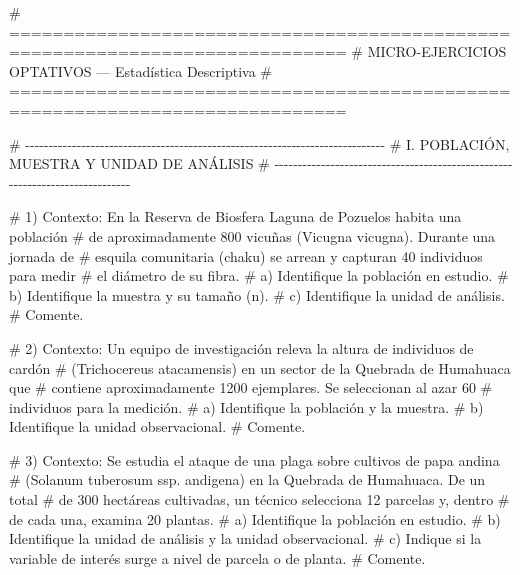 \documentclass[
  spanish,
  letterpaper,
  DIV=11,
  numbers=noendperiod]{scrreprt}
\newenvironment{Shaded}{\begin{snugshade}}{\end{snugshade}}
\newcommand{\CommentTok}[1]{\textcolor[rgb]{0.37,0.37,0.37}{#1}}
\begin{document}
\begin{Shaded}
\begin{Highlighting}[]


\CommentTok{\# =============================================================================}
\CommentTok{\# MICRO{-}EJERCICIOS OPTATIVOS — Estadística Descriptiva}
\CommentTok{\# =============================================================================}

\CommentTok{\# {-}{-}{-}{-}{-}{-}{-}{-}{-}{-}{-}{-}{-}{-}{-}{-}{-}{-}{-}{-}{-}{-}{-}{-}{-}{-}{-}{-}{-}{-}{-}{-}{-}{-}{-}{-}{-}{-}{-}{-}{-}{-}{-}{-}{-}{-}{-}{-}{-}{-}{-}{-}{-}{-}{-}{-}{-}{-}{-}{-}{-}{-}{-}{-}{-}{-}{-}{-}{-}{-}{-}{-}{-}{-}{-}{-}{-}}
\CommentTok{\# I. POBLACIÓN, MUESTRA Y UNIDAD DE ANÁLISIS}
\CommentTok{\# {-}{-}{-}{-}{-}{-}{-}{-}{-}{-}{-}{-}{-}{-}{-}{-}{-}{-}{-}{-}{-}{-}{-}{-}{-}{-}{-}{-}{-}{-}{-}{-}{-}{-}{-}{-}{-}{-}{-}{-}{-}{-}{-}{-}{-}{-}{-}{-}{-}{-}{-}{-}{-}{-}{-}{-}{-}{-}{-}{-}{-}{-}{-}{-}{-}{-}{-}{-}{-}{-}{-}{-}{-}{-}{-}{-}{-}}

\CommentTok{\# 1) Contexto: En la Reserva de Biosfera Laguna de Pozuelos habita una población}
\CommentTok{\#    de aproximadamente 800 vicuñas (Vicugna vicugna). Durante una jornada de}
\CommentTok{\#    esquila comunitaria (chaku) se arrean y capturan 40 individuos para medir}
\CommentTok{\#    el diámetro de su fibra.}
\CommentTok{\#    a) Identifique la población en estudio.}
\CommentTok{\#    b) Identifique la muestra y su tamaño (n).}
\CommentTok{\#    c) Identifique la unidad de análisis.}
\CommentTok{\#    Comente.}


\CommentTok{\# 2) Contexto: Un equipo de investigación releva la altura de individuos de cardón}
\CommentTok{\#    (Trichocereus atacamensis) en un sector de la Quebrada de Humahuaca que}
\CommentTok{\#    contiene aproximadamente 1200 ejemplares. Se seleccionan al azar 60}
\CommentTok{\#    individuos para la medición.}
\CommentTok{\#    a) Identifique la población y la muestra.}
\CommentTok{\#    b) Identifique la unidad observacional.}
\CommentTok{\#    Comente.}



\CommentTok{\# 3) Contexto: Se estudia el ataque de una plaga sobre cultivos de papa andina}
\CommentTok{\#    (Solanum tuberosum ssp. andigena) en la Quebrada de Humahuaca. De un total}
\CommentTok{\#    de 300 hectáreas cultivadas, un técnico selecciona 12 parcelas y, dentro}
\CommentTok{\#    de cada una, examina 20 plantas.}
\CommentTok{\#    a) Identifique la población en estudio.}
\CommentTok{\#    b) Identifique la unidad de análisis y la unidad observacional.}
\CommentTok{\#    c) Indique si la variable de interés surge a nivel de parcela o de planta.}
\CommentTok{\#    Comente.}



\end{Highlighting}
\end{Shaded}
\end{document}
